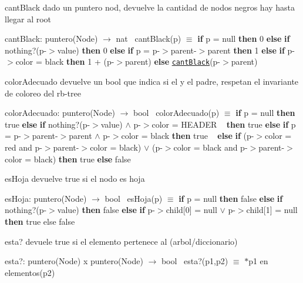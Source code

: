 \begin{DoxyParagraph}{cant\+Black}
dado un puntero nod, devuelve la cantidad de nodos negros hay hasta llegar al root

cant\+Black\+: puntero(\+Node) $\to$ nat~\newline
 cant\+Black(p) $\equiv$ {\bfseries if} p = null {\bfseries then} 0 {\bfseries else} {\bfseries if} nothing?(p-\/$>$value) {\bfseries then} 0 {\bfseries else} {\bfseries if} p = p-\/$>$parent-\/$>$parent {\bfseries then} 1 {\bfseries else} {\bfseries if} p-\/$>$color = black {\bfseries then} 1 + (p-\/$>$parent) {\bfseries else} \href{axiomas.html#cantBlack}{\tt cant\+Black}(p-\/$>$parent) 
\end{DoxyParagraph}


\begin{DoxyParagraph}{color\+Adecuado}
devuelve un bool que indica si el y el padre, respetan el invariante de coloreo del rb-\/tree

color\+Adecuado\+: puntero(\+Node) $\to$ bool~\newline
 color\+Adecuado(p) $\equiv$ {\bfseries if} p = null {\bfseries then} true {\bfseries else} {\bfseries if} nothing?(p-\/$>$value) $\land$ p-\/$>$color = H\+E\+A\+D\+ER ~\newline
 {\bfseries then} true {\bfseries else} {\bfseries if} p = p-\/$>$parent-\/$>$parent $\land$ p-\/$>$color = black {\bfseries then} true ~\newline
 {\bfseries else} {\bfseries if} (p-\/$>$color = red and p-\/$>$parent-\/$>$color = black) $\lor$ (p-\/$>$color = black and p-\/$>$parent-\/$>$color = black) {\bfseries then} true {\bfseries else} false 
\end{DoxyParagraph}


\begin{DoxyParagraph}{es\+Hoja}
devuelve true si el nodo es hoja

es\+Hoja\+: puntero(\+Node) $\to$ bool~\newline
 es\+Hoja(p) $\equiv$ {\bfseries if} p = null {\bfseries then} false {\bfseries else} {\bfseries if} nothing?(p-\/$>$value) {\bfseries then} false {\bfseries else} {\bfseries if} p-\/$>$child\mbox{[}0\mbox{]} = null $\lor$ p-\/$>$child\mbox{[}1\mbox{]} = null {\bfseries then} true else false 
\end{DoxyParagraph}


\begin{DoxyParagraph}{esta?}
devuele true si el elemento pertenece al (arbol/diccionario)

esta?\+: puntero(\+Node) x puntero(\+Node) $\to$ bool~\newline
 esta?(p1,p2) $\equiv$ $\ast$p1 en elementos(p2) 
\end{DoxyParagraph}


